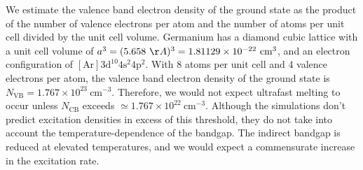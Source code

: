 We estimate the valence band electron density of the ground state as the product of the number of valence electrons per atom and the number of atoms per unit cell divided by the unit cell volume. Germanium has a diamond cubic lattice with a unit cell volume of ${a^3 = (5.658 \ \AA)^3 = 1.81129 \times 10^{-22} \ \textrm{cm}^3}$, and an electron configuration of ${[\textrm{Ar}] 3\textrm{d}^{10 }4\textrm{s}^2 4\textrm{p}^2}$. With 8 atoms per unit cell and 4 valence electrons per atom, the valence band electron density of the ground state is $N_{\textrm{VB}} = 1.767 \times 10^{23} \ \textrm{cm}^{-3}$. Therefore, we would not expect ultrafast melting to occur unless $N_{\textrm{CB}}$ exceeds $\simeq 1.767 \times 10^{22} \ \textrm{cm}^{-3}$. Although the simulations don't predict excitation densities in excess of this threshold, they do not take into account the temperature-dependence of the bandgap. The indirect bandgap is reduced at elevated temperatures, and we would expect a commensurate increase in the excitation rate.

